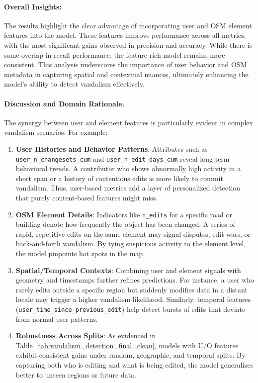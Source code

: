 \documentclass[
    13pt, %
    a4paper, %
    listof=totoc, %
    bibliography=totoc, %
    index=totoc, %
    headsepline
]{scrreprt}
\begin{document}
\paragraph{Overall Insights:}  
The results highlight the clear advantage of incorporating user and OSM element features into the model. These features improve performance across all metrics, with the most significant gains observed in precision and accuracy. While there is some overlap in recall performance, the feature-rich model remains more consistent. This analysis underscores the importance of user behavior and OSM metadata in capturing spatial and contextual nuances, ultimately enhancing the model's ability to detect vandalism effectively.



\paragraph{Discussion and Domain Rationale.}
The synergy between user and element features is particularly evident in complex vandalism scenarios. For example:
\begin{enumerate}
    \item \textbf{User Histories and Behavior Patterns}: 
    Attributes such as \newline \texttt{user\_n\_changesets\_cum} and \texttt{user\_n\_edit\_days\_cum} reveal long-term behavioral trends. A contributor who shows abnormally high activity in a short span or a history of contentious edits is more likely to commit vandalism. Thus, user-based metrics add a layer of personalized detection that purely content-based features might miss.

    \item \textbf{OSM Element Details}: 
    Indicators like \texttt{n\_edits} for a specific road or building denote how frequently the object has been changed. A series of rapid, repetitive edits on the same element may signal disputes, edit wars, or back-and-forth vandalism. By tying suspicious activity to the element level, the model pinpoints hot spots in the map.

    \item \textbf{Spatial/Temporal Contexts}: 
    Combining user and element signals with geometry and timestamps further refines predictions. For instance, a user who rarely edits outside a specific region but suddenly modifies data in a distant locale may trigger a higher vandalism likelihood. Similarly, temporal features (\texttt{user\_time\_since\_previous\_edit}) help detect bursts of edits that deviate from normal user patterns.

    \item \textbf{Robustness Across Splits}: 
    As evidenced in Table~\ref{tab:vandalism_detection_final_clean}, models with U/O features exhibit consistent gains under random, geographic, and temporal splits. By capturing both who is editing and what is being edited, the model generalizes better to unseen regions or future data.
\end{enumerate}
\end{document}
